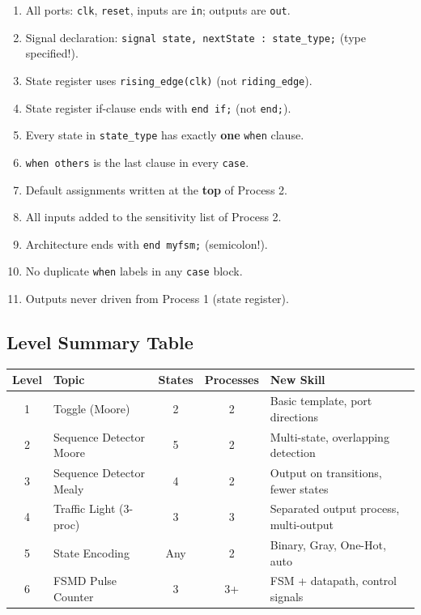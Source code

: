 \documentclass[12pt,a4paper]{article}
\newcommand{\faCheck}{\ding{51}}
\newcommand{\faCheckSquare}{\ding{52}}
\begin{document}
\begin{tcolorbox}[successbox, title={\faCheckSquare\ Before You Synthesize --- Run This Checklist}]
  \begin{enumerate}[leftmargin=1.5cm]
    \item[\faCheck] All ports: \texttt{clk}, \texttt{reset}, inputs are \texttt{in};
                   outputs are \texttt{out}.
    \item[\faCheck] Signal declaration: \texttt{signal state, nextState : state\_type;}
                   (type specified!).
    \item[\faCheck] State register uses \texttt{rising\_edge(clk)} (not \texttt{riding\_edge}).
    \item[\faCheck] State register if-clause ends with \texttt{end if;} (not \texttt{end;}).
    \item[\faCheck] Every state in \texttt{state\_type} has exactly \textbf{one}
                   \texttt{when} clause.
    \item[\faCheck] \texttt{when others} is the last clause in every \texttt{case}.
    \item[\faCheck] Default assignments written at the \textbf{top} of Process 2.
    \item[\faCheck] All inputs added to the sensitivity list of Process 2.
    \item[\faCheck] Architecture ends with \texttt{end myfsm;} (semicolon!).
    \item[\faCheck] No duplicate \texttt{when} labels in any \texttt{case} block.
    \item[\faCheck] Outputs never driven from Process 1 (state register).
  \end{enumerate}
\end{tcolorbox}

\subsection{Level Summary Table}

\begin{center}
\renewcommand{\arraystretch}{1.5}
\begin{tabular}{clccp{4.5cm}}
  \toprule
  \textbf{Level} & \textbf{Topic} & \textbf{States} & \textbf{Processes} & \textbf{New Skill} \\
  \midrule
  1 & Toggle (Moore)          & 2   & 2 & Basic template, port directions \\
  2 & Sequence Detector Moore & 5   & 2 & Multi-state, overlapping detection \\
  3 & Sequence Detector Mealy & 4   & 2 & Output on transitions, fewer states \\
  4 & Traffic Light (3-proc)  & 3   & 3 & Separated output process, multi-output \\
  5 & State Encoding          & Any & 2 & Binary, Gray, One-Hot, auto \\
  6 & FSMD Pulse Counter      & 3   & 3+ & FSM + datapath, control signals \\
  \bottomrule
\end{tabular}
\end{center}
\end{document}
